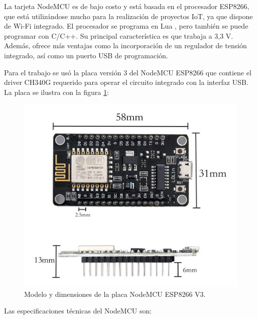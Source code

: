 La tarjeta NodeMCU es de bajo costo y está basada en el procesador ESP8266, que está utilizándose mucho para la realización de proyectos IoT, ya que dispone de Wi-Fi integrado. El procesador se programa en Lua \citep{WEBSITE:38}, pero también se puede programar con C/C++. Su principal característica es que trabaja a 3,3 V.  Además, ofrece más ventajas como la incorporación de un regulador de tensión integrado, así como un puerto USB de programación. 

 
Para el trabajo se usó la placa versión 3 del NodeMCU ESP8266 que contiene el driver CH340G requerido para operar el circuito integrado con la interfaz USB. La placa se ilustra con la figura \ref{fig:nodemcu}:

\begin{figure}[htbp]
	\centering
	\includegraphics[width=.8\textwidth]{./Figures/nodemcuV3.jpg}
	\caption{Modelo y dimensiones de la placa NodeMCU ESP8266 V3.}

	\label{fig:nodemcu}
\end{figure}

Las especificaciones técnicas del NodeMCU son:

